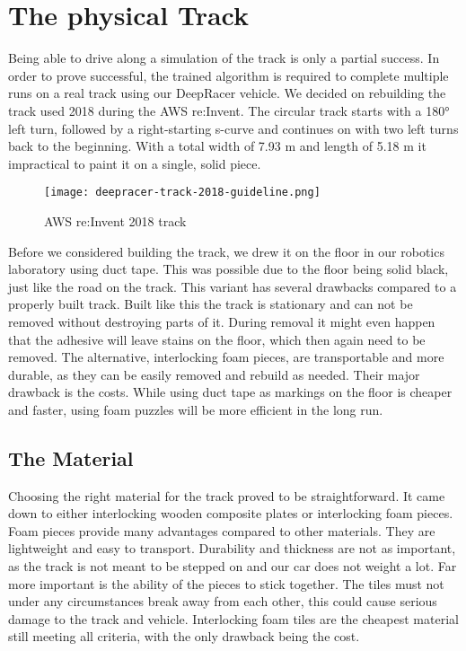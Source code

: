 \chapter{The physical Track}

Being able to drive along a simulation of the track is only a partial success. In order to prove successful, the trained algorithm is required to complete multiple runs on a real track using our DeepRacer vehicle. We decided on rebuilding the track used 2018 during the AWS re:Invent. The circular track starts with a 180° left turn, followed by a right-starting s-curve and continues on with two left turns back to the beginning. With a total width of 7.93 m and length of 5.18 m it impractical to paint it on a single, solid piece.

\begin{figure}
    \centering
    \texttt{[image: deepracer-track-2018-guideline.png]}
    \caption{AWS re:Invent 2018 track}
    \label{fig:track}
\end{figure}

Before we considered building the track, we drew it on the floor in our robotics laboratory using duct tape. This was possible due to the floor being solid black, just like the road on the track. This variant has several drawbacks compared to a properly built track. Built like this the track is stationary and can not be removed without destroying parts of it. During removal it might even happen that the adhesive will leave stains on the floor, which then again need to be removed. The alternative, interlocking foam pieces, are transportable and more durable, as they can be easily removed and rebuild as needed. Their major drawback is the costs. While using duct tape as markings on the floor is cheaper and faster, using foam puzzles will be more efficient in the long run.

\section{The Material}
Choosing the right material for the track proved to be straightforward. It came down to either interlocking wooden composite plates or interlocking foam pieces. Foam pieces provide many advantages compared to other materials. They are lightweight and easy to transport. Durability and thickness are not as important, as the track is not meant to be stepped on and our car does not weight a lot. Far more important is the ability of the pieces to stick together. The tiles must not under any circumstances break away from each other, this could cause serious damage to the track and vehicle. Interlocking foam tiles are the cheapest material still meeting all criteria, with the only drawback being the cost.

